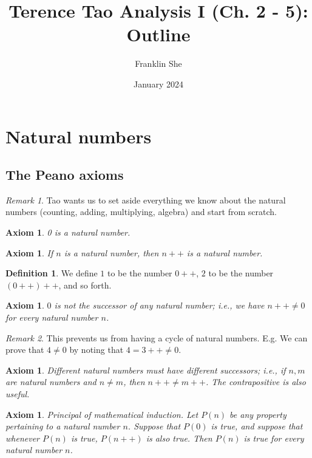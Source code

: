 \documentclass[12pt]{article}
\title{Terence Tao Analysis I (Ch. 2 - 5): Outline}
\author{Franklin She}
\date{January 2024}
\newtheorem{axiom}[theorem]{Axiom}
\theoremstyle{definition}
\newtheorem{definition}[theorem]{Definition}
\theoremstyle{remark}
\newtheorem*{remark}{Remark}
\begin{document}
\maketitle
\tableofcontents

\section{Natural numbers}

\subsection{The Peano axioms}

\begin{remark}
    Tao wants us to set aside everything we know about the natural numbers (counting, adding, multiplying, algebra) and start from scratch.
\end{remark}

\begin{axiom}
    0 is a natural number.
\end{axiom}

\begin{axiom}
    If $n$ is a natural number, then $n++$ is a natural number.
\end{axiom}

\begin{definition}
    We define $1$ to be the number $0++$, $2$ to be the number $(0++)++$, and so forth.
\end{definition}

\begin{axiom}
    $0$ is not the successor of any natural number; i.e., we have $n++ \neq 0$ for every natural number $n$.
\end{axiom}

\begin{remark}
    This prevents us from having a cycle of natural numbers. E.g. We can prove that $4 \neq 0$ by noting that $4 = 3++ \neq 0$.
\end{remark}

\begin{axiom}
    Different natural numbers must have different successors; i.e., if $n,m$ are natural numbers and $n \neq m$, then $n++ \neq m++$. The contrapositive is also useful.
\end{axiom}

\begin{axiom}{Principal of mathematical induction.}
    Let $P(n)$ be any property pertaining to a natural number $n$. Suppose that $P(0)$ is true, and suppose that whenever $P(n)$ is true, $P(n++)$ is also true. Then $P(n)$ is true for every natural number $n$.
\end{axiom}
\end{document}
